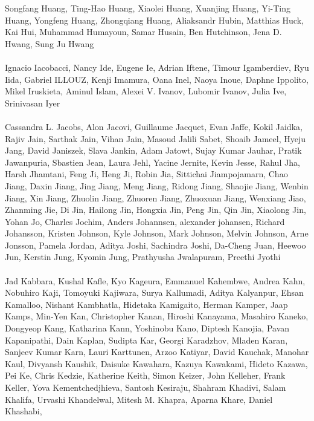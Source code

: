\documentclass[11pt]{article}
\begin{document}
\begin{description}[itemsep=4mm, style=nextline]
Songfang Huang, 
Ting-Hao Huang, 
Xiaolei Huang, 
Xuanjing Huang, 
Yi-Ting Huang, 
Yongfeng Huang, 
Zhongqiang Huang, 
Aliaksandr Hubin, 
Matthias Huck, 
Kai Hui, 
Muhammad Humayoun, 
Samar Husain, 
Ben Hutchinson, 
Jena D. Hwang, 
Sung Ju Hwang
\\
\\
Ignacio Iacobacci, 
Nancy Ide, 
Eugene Ie, 
Adrian Iftene, 
Timour Igamberdiev, 
Ryu Iida, 
Gabriel ILLOUZ, 
Kenji Imamura, 
Oana Inel, 
Naoya Inoue, 
Daphne Ippolito, 
Mikel Iruskieta, 
Aminul Islam, 
Alexei V. Ivanov, 
Lubomir Ivanov, 
Julia Ive, 
Srinivasan Iyer
\\
\\
Cassandra L. Jacobs, 
Alon Jacovi, 
Guillaume Jacquet, 
Evan Jaffe, 
Kokil Jaidka, 
Rajiv Jain, 
Sarthak Jain, 
Vihan Jain, 
Masoud Jalili Sabet, 
Shoaib Jameel, 
Hyeju Jang, 
David Janiszek, 
Slava Jankin, 
Adam Jatowt, 
Sujay Kumar Jauhar, 
Pratik Jawanpuria, 
Sbastien Jean, 
Laura Jehl, 
Yacine Jernite, 
Kevin Jesse, 
Rahul Jha, 
Harsh Jhamtani, 
Feng Ji, 
Heng Ji, 
Robin Jia, 
Sittichai Jiampojamarn, 
Chao Jiang, 
Daxin Jiang, 
Jing Jiang, 
Meng Jiang, 
Ridong Jiang, 
Shaojie Jiang, 
Wenbin Jiang, 
Xin Jiang, 
Zhuolin Jiang, 
Zhuoren Jiang, 
Zhuoxuan Jiang, 
Wenxiang Jiao, 
Zhanming Jie, 
Di Jin, 
Hailong Jin, 
Hongxia Jin, 
Peng Jin, 
Qin Jin, 
Xiaolong Jin, 
Yohan Jo, 
Charles Jochim, 
Anders Johannsen, 
alexander johansen, 
Richard Johansson, 
Kristen Johnson, 
Kyle Johnson, 
Mark Johnson, 
Melvin Johnson, 
Arne Jonsson, 
Pamela Jordan, 
Aditya Joshi, 
Sachindra Joshi, 
Da-Cheng Juan, 
Heewoo Jun, 
Kerstin Jung, 
Kyomin Jung, 
Prathyusha Jwalapuram, 
Preethi Jyothi
\\
\\
Jad Kabbara, 
Kushal Kafle, 
Kyo Kageura, 
Emmanuel Kahembwe, 
Andrea Kahn, 
Nobuhiro Kaji, 
Tomoyuki Kajiwara, 
Surya Kallumadi, 
Aditya Kalyanpur, 
Ehsan Kamalloo, 
Nishant Kambhatla, 
Hidetaka Kamigaito, 
Herman Kamper, 
Jaap Kamps, 
Min-Yen Kan, 
Christopher Kanan, 
Hiroshi Kanayama, 
Masahiro Kaneko, 
Dongyeop Kang, 
Katharina Kann, 
Yoshinobu Kano, 
Diptesh Kanojia, 
Pavan Kapanipathi, 
Dain Kaplan, 
Sudipta Kar, 
Georgi Karadzhov, 
Mladen Karan, 
Sanjeev Kumar Karn, 
Lauri Karttunen, 
Arzoo Katiyar, 
David Kauchak, 
Manohar Kaul, 
Divyansh Kaushik, 
Daisuke Kawahara, 
Kazuya Kawakami, 
Hideto Kazawa, 
Pei Ke, 
Chris Kedzie, 
Katherine Keith, 
Simon Keizer, 
John Kelleher, 
Frank Keller, 
Yova Kementchedjhieva, 
Santosh Kesiraju, 
Shahram Khadivi, 
Salam Khalifa, 
Urvashi Khandelwal, 
Mitesh M. Khapra, 
Aparna Khare, 
Daniel Khashabi, 

\end{description}
\end{document}
